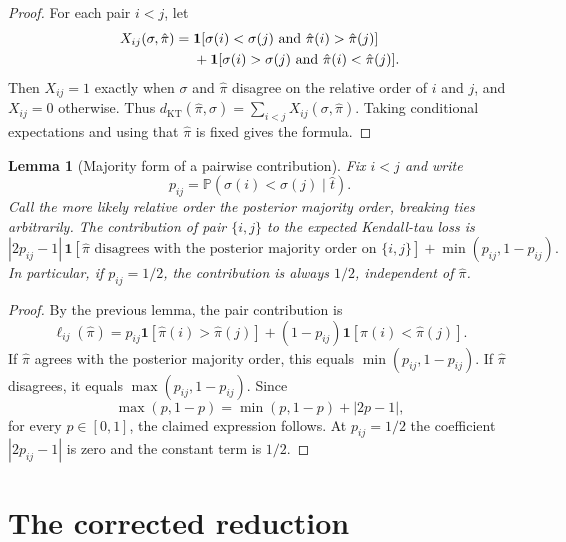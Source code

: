 \documentclass[11pt]{article}
\newtheorem{lemma}{Lemma}
\newcommand{\Prb}{\mathbb{P}}
\newcommand{\ind}{\mathbf{1}}
\newcommand{\KT}{\operatorname{KT}}
\begin{document}
\begin{proof}
For each pair $i<j$, let
\begin{align}
  X_{ij}(\sigma,\hat\pi)
  ={}&\ind[\sigma(i)<\sigma(j)\text{ and }\hat\pi(i)>\hat\pi(j)] \notag\\
   &+\ind[\sigma(i)>\sigma(j)\text{ and }\hat\pi(i)<\hat\pi(j)].
\end{align}
Then $X_{ij}=1$ exactly when $\sigma$ and $\hat\pi$ disagree on the relative order of $i$ and $j$, and $X_{ij}=0$ otherwise.  Thus $d_{\KT}(\hat\pi,\sigma)=\sum_{i<j}X_{ij}(\sigma,\hat\pi)$.  Taking conditional expectations and using that $\hat\pi$ is fixed gives the formula.
\end{proof}

\begin{lemma}[Majority form of a pairwise contribution]
Fix $i<j$ and write
\begin{equation}
  p_{ij}=\Prb(\sigma(i)<\sigma(j)\mid \hat t).
\end{equation}
Call the more likely relative order the posterior majority order, breaking ties arbitrarily.  The contribution of pair $\{i,j\}$ to the expected Kendall-tau loss is
\begin{equation}
  |2p_{ij}-1|\,\ind[\hat\pi\text{ disagrees with the posterior majority order on }\{i,j\}]
  +\min(p_{ij},1-p_{ij}).
\end{equation}
In particular, if $p_{ij}=1/2$, the contribution is always $1/2$, independent of $\hat\pi$.
\end{lemma}

\begin{proof}
By the previous lemma, the pair contribution is
\begin{equation}
  \ell_{ij}(\hat\pi)=p_{ij}\ind[\hat\pi(i)>\hat\pi(j)]
  +(1-p_{ij})\ind[\hat\pi(i)<\hat\pi(j)].
\end{equation}
If $\hat\pi$ agrees with the posterior majority order, this equals $\min(p_{ij},1-p_{ij})$.  If $\hat\pi$ disagrees, it equals $\max(p_{ij},1-p_{ij})$.  Since
\begin{equation}
  \max(p,1-p)=\min(p,1-p)+|2p-1|,
\end{equation}
for every $p\in[0,1]$, the claimed expression follows.  At $p_{ij}=1/2$ the coefficient $|2p_{ij}-1|$ is zero and the constant term is $1/2$.
\end{proof}

\section{The corrected reduction}
\end{document}
